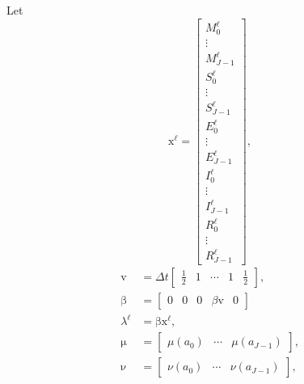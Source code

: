 \documentclass{jpmarticle}
\renewcommand{\vec}[1]{\boldsymbol{\mathrm{#1}}}
\begin{document}
Let
\begin{equation}
  \vec{x}^{\ell} =
  \begin{bmatrix}
    M_0^{\ell} \\ \vdots \\ M_{J - 1}^{\ell} \\
    S_0^{\ell} \\ \vdots \\ S_{J - 1}^{\ell} \\
    E_0^{\ell} \\ \vdots \\ E_{J - 1}^{\ell} \\
    I_0^{\ell} \\ \vdots \\ I_{J - 1}^{\ell} \\
    R_0^{\ell} \\ \vdots \\ R_{J - 1}^{\ell}
  \end{bmatrix},
\end{equation}
\begin{equation}
  \begin{split}
    \vec{v} &=
    \Delta t
    \begin{bmatrix}
      \frac{1}{2} & 1 & \cdots & 1 & \frac{1}{2}
    \end{bmatrix},
    \\
    \vec{\beta} &=
    \begin{bmatrix}
      \vec{0} & \vec{0} & \vec{0} & \beta \vec{v} & \vec{0}
    \end{bmatrix}
    \\
    \lambda^{\ell} &=
    \vec{\beta} \vec{x}^{\ell},
    \\
    \vec{\mu} &=
    \begin{bmatrix}
      \mu(a_0) & \cdots & \mu(a_{J - 1})
    \end{bmatrix},
    \\
    \vec{\nu} &=
    \begin{bmatrix}
      \nu(a_0) & \cdots & \nu(a_{J - 1})
    \end{bmatrix},
  \end{split}
\end{equation}
\end{document}

